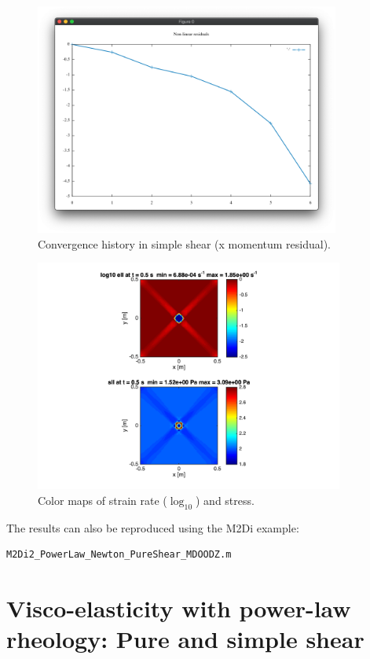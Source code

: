 \documentclass[12pt,english,openany]{scrbook}
\begin{document}
\begin{figure}[ht!]
\centerline{\includegraphics[height=3.0in]{./Figures/Shear_pwl_Convergence_SS_MDOODZ}}
\caption{Convergence history in simple shear (x momentum residual).}
\label{PureShear_pwl_cmaps}
\end{figure}


\begin{figure}[ht!]
\centerline{\includegraphics[height=3.0in]{./Figures/Shear_pwl_cmaps_MDOODZ}}
\caption{Color maps of strain rate ($\log_{10}$) and stress.}
\label{PureShear_pwl_cmaps}
\end{figure}

The results can also be reproduced using the M2Di example:
\begin{verbatim} 
M2Di2_PowerLaw_Newton_PureShear_MDOODZ.m
\end{verbatim}

\section{Visco-elasticity with power-law rheology: Pure and simple shear}
\end{document}
